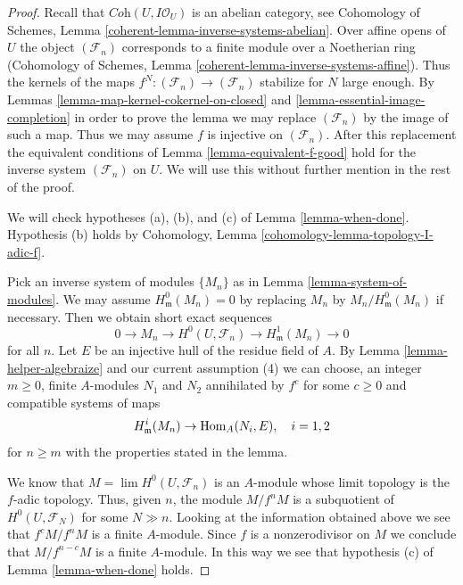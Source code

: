 \begin{proof}
Recall that $\textit{Coh}(U, I\mathcal{O}_U)$ is an abelian category, see
Cohomology of Schemes, Lemma \ref{coherent-lemma-inverse-systems-abelian}.
Over affine opens of $U$ the object $(\mathcal{F}_n)$
corresponds to a finite module over a Noetherian ring
(Cohomology of Schemes, Lemma \ref{coherent-lemma-inverse-systems-affine}).
Thus the kernels of the maps $f^N : (\mathcal{F}_n) \to (\mathcal{F}_n)$
stabilize for $N$ large enough. By
Lemmas \ref{lemma-map-kernel-cokernel-on-closed} and
\ref{lemma-essential-image-completion}
in order to prove the lemma
we may replace $(\mathcal{F}_n)$ by the image of such a map.
Thus we may assume $f$ is injective on $(\mathcal{F}_n)$.
After this replacement the equivalent conditions of
Lemma \ref{lemma-equivalent-f-good} hold for the inverse system
$(\mathcal{F}_n)$ on $U$. We will use this without further mention
in the rest of the proof.

\medskip\noindent
We will check hypotheses (a), (b), and (c) of
Lemma \ref{lemma-when-done}. Hypothesis (b) holds by
Cohomology, Lemma \ref{cohomology-lemma-topology-I-adic-f}.

\medskip\noindent
Pick an inverse system of modules $\{M_n\}$ as in
Lemma \ref{lemma-system-of-modules}.
We may assume $H^0_\mathfrak m(M_n) = 0$ by replacing $M_n$ by
$M_n/H^0_\mathfrak m(M_n)$ if necessary. Then we obtain short exact
sequences
$$
0 \to M_n \to H^0(U, \mathcal{F}_n) \to H^1_\mathfrak m(M_n) \to 0
$$
for all $n$. Let $E$ be an injective hull of the residue field of $A$.
By Lemma \ref{lemma-helper-algebraize} and our current assumption (4)
we can choose, an integer $m \geq 0$, finite $A$-modules
$N_1$ and $N_2$ annihilated by $f^c$ for some $c \geq 0$ and
compatible systems of maps
$$
H^i_\mathfrak m(M_n) \to \mathop{\mathrm{Hom}}\nolimits_A(N_i, E), \quad i = 1, 2
$$
for $n \geq m$
with the properties stated in the lemma.

\medskip\noindent
We know that $M = \lim H^0(U, \mathcal{F}_n)$ is an $A$-module whose
limit topology is the $f$-adic topology. Thus, given $n$, the module
$M/f^nM$ is a subquotient of $H^0(U, \mathcal{F}_N)$ for some $N \gg n$.
Looking at the information obtained above we see that
$f^cM/f^nM$ is a finite $A$-module. Since $f$ is a nonzerodivisor
on $M$ we conclude that $M/f^{n - c}M$ is a finite $A$-module.
In this way we see that hypothesis (c) of Lemma \ref{lemma-when-done} holds.


\end{proof}
